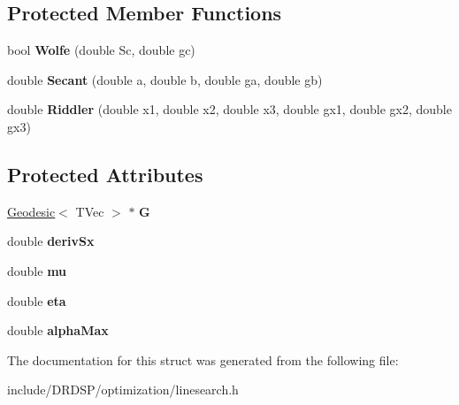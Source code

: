 \subsection*{Protected Member Functions}
\begin{DoxyCompactItemize}
\item 
\hypertarget{struct_d_r_d_s_p_1_1_line_search_a3ccc22ae4853a6b617ca2e13bda842f2}{bool {\bfseries Wolfe} (double Sc, double gc)}\label{struct_d_r_d_s_p_1_1_line_search_a3ccc22ae4853a6b617ca2e13bda842f2}

\item 
\hypertarget{struct_d_r_d_s_p_1_1_line_search_a3b1a2771360efeaf9434479b0df9fbf1}{double {\bfseries Secant} (double a, double b, double ga, double gb)}\label{struct_d_r_d_s_p_1_1_line_search_a3b1a2771360efeaf9434479b0df9fbf1}

\item 
\hypertarget{struct_d_r_d_s_p_1_1_line_search_a202ae4e26b280c839008a5021e7afa67}{double {\bfseries Riddler} (double x1, double x2, double x3, double gx1, double gx2, double gx3)}\label{struct_d_r_d_s_p_1_1_line_search_a202ae4e26b280c839008a5021e7afa67}

\end{DoxyCompactItemize}
\subsection*{Protected Attributes}
\begin{DoxyCompactItemize}
\item 
\hypertarget{struct_d_r_d_s_p_1_1_line_search_a0512b9941dfb6af38a9bf1296904d7eb}{\hyperlink{struct_d_r_d_s_p_1_1_geodesic}{Geodesic}$<$ T\-Vec $>$ $\ast$ {\bfseries G}}\label{struct_d_r_d_s_p_1_1_line_search_a0512b9941dfb6af38a9bf1296904d7eb}

\item 
\hypertarget{struct_d_r_d_s_p_1_1_line_search_a4872eda50336fe3573d2118d3b929ef0}{double {\bfseries deriv\-Sx}}\label{struct_d_r_d_s_p_1_1_line_search_a4872eda50336fe3573d2118d3b929ef0}

\item 
\hypertarget{struct_d_r_d_s_p_1_1_line_search_a7cb4acca18846268383c8e579bb58260}{double {\bfseries mu}}\label{struct_d_r_d_s_p_1_1_line_search_a7cb4acca18846268383c8e579bb58260}

\item 
\hypertarget{struct_d_r_d_s_p_1_1_line_search_a05c6aafb2cd71e6b9bac7dcc1724986e}{double {\bfseries eta}}\label{struct_d_r_d_s_p_1_1_line_search_a05c6aafb2cd71e6b9bac7dcc1724986e}

\item 
\hypertarget{struct_d_r_d_s_p_1_1_line_search_aa5f9dd44b7ef2c694469b31f3e7ee9d7}{double {\bfseries alpha\-Max}}\label{struct_d_r_d_s_p_1_1_line_search_aa5f9dd44b7ef2c694469b31f3e7ee9d7}

\end{DoxyCompactItemize}


The documentation for this struct was generated from the following file\-:\begin{DoxyCompactItemize}
\item 
include/\-D\-R\-D\-S\-P/optimization/linesearch.\-h\end{DoxyCompactItemize}
